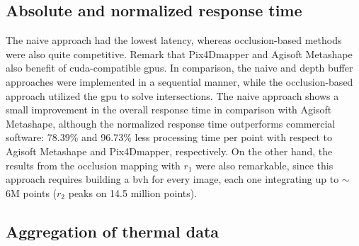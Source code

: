 \subsection{Absolute and normalized response time}

The naive approach had the lowest latency, whereas occlusion-based methods were also quite competitive. Remark that Pix4Dmapper and Agisoft Metashape also benefit of \acrshort{cuda}-compatible \acrshort{gpu}s. In comparison, the naive and depth buffer approaches were implemented in a sequential manner, while the occlusion-based approach utilized the \acrshort{gpu} to solve intersections. The naive approach shows a small improvement in the overall response time in comparison with Agisoft Metashape, although the normalized response time outperforms commercial software: 78.39\% and 96.73\% less processing time per point with respect to Agisoft Metashape and Pix4Dmapper, respectively. On the other hand, the results from the occlusion mapping with $r_1$ were also remarkable, since this approach requires building a \acrshort{bvh} for every image, each one integrating up to $\sim$6M points ($r_2$ peaks on 14.5 million points). 

\subsection{Aggregation of thermal data}

